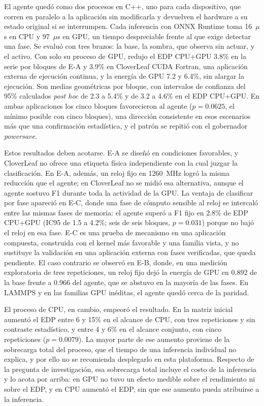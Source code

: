 El agente quedó como dos procesos en C++, uno para cada dispositivo, que corren en paralelo a la aplicación sin modificarla y devuelven el hardware a su estado original si se interrumpen. Cada inferencia con ONNX Runtime toma 16~$\mu$s en CPU y 97~$\mu$s en GPU, un tiempo despreciable frente al que exige detectar una fase. Se evaluó con tres brazos: la base, la sombra, que observa sin actuar, y el activo. Con solo su proceso de GPU, redujo el EDP CPU+GPU 3.8\% en la serie por bloques de E-A y 3.9\% en CloverLeaf CUDA Fortran, una aplicación externa de ejecución continua, y la energía de GPU 7.2 y 6.4\%, sin alargar la ejecución. Son medias geométricas por bloque, con intervalos de confianza del 95\% calculados \textit{post hoc} de 2.3 a 5.4\% y de 3.2 a 4.6\% en el EDP CPU+GPU. En ambas aplicaciones los cinco bloques favorecieron al agente ($p=0.0625$, el mínimo posible con cinco bloques), una dirección consistente en esos escenarios más que una confirmación estadística, y el patrón se repitió con el gobernador \textit{powersave}.

Estos resultados deben acotarse. E-A se diseñó en condiciones favorables, y CloverLeaf no ofrece una etiqueta física independiente con la cual juzgar la clasificación. En E-A, además, un reloj fijo en 1260~MHz logró la misma reducción que el agente; en CloverLeaf no se midió esa alternativa, aunque el agente sostuvo F1 durante toda la actividad de la GPU. La ventaja de clasificar por fase apareció en E-C, donde una fase de cómputo sensible al reloj se intercaló entre las mismas fases de memoria: el agente superó a F1 fijo en 2.8\% de EDP CPU+GPU (IC95 de 1.5 a 4.2\%; seis de seis bloques, $p=0.031$) porque no bajó el reloj en esa fase. E-C es una prueba de mecanismo en una aplicación compuesta, construida con el kernel más favorable y una familia vista, y no sustituye la validación en una aplicación externa con fases verificadas, que queda pendiente. El caso contrario se observó en E-B, donde, en una medición exploratoria de tres repeticiones, un reloj fijo dejó la energía de GPU en 0.892 de la base frente a 0.966 del agente, que se abstuvo en la mayoría de las fases. En LAMMPS y en las familias GPU inéditas, el agente quedó cerca de la paridad.

El proceso de CPU, en cambio, empeoró el resultado. En la matriz inicial aumentó el EDP entre 6 y 15\% en el alcance de CPU, con tres repeticiones y sin contraste estadístico, y entre 4 y 6\% en el alcance conjunto, con cinco repeticiones ($p=0.0079$). La mayor parte de ese aumento proviene de la sobrecarga total del proceso, que el tiempo de una inferencia individual no explica, y por ello no se recomienda desplegarlo en esta plataforma. Respecto de la pregunta de investigación, esa sobrecarga total incluye el costo de la inferencia y lo acota por arriba: en GPU no tuvo un efecto medible sobre el rendimiento ni sobre el EDP, y en CPU aumentó el EDP, sin que ese aumento pueda atribuirse a la inferencia.

